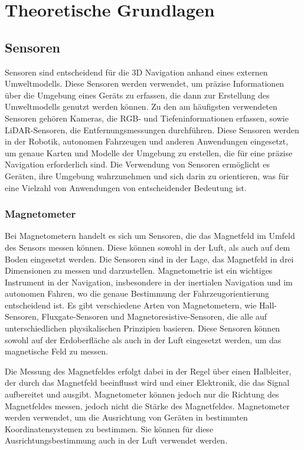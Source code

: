 \chapter{Theoretische Grundlagen}

\section{Sensoren} \label{sensoren:section}

Sensoren sind entscheidend für die 3D Navigation anhand eines externen Umweltmodells. Diese Sensoren werden verwendet, um präzise Informationen über die Umgebung eines Geräts zu erfassen, die dann zur Erstellung des Umweltmodells genutzt werden können. Zu den am häufigsten verwendeten Sensoren gehören Kameras, die RGB- und Tiefeninformationen erfassen, sowie LiDAR-Sensoren, die Entfernungsmessungen durchführen. Diese Sensoren werden in der Robotik, autonomen Fahrzeugen und anderen Anwendungen eingesetzt, um genaue Karten und Modelle der Umgebung zu erstellen, die für eine präzise Navigation erforderlich sind. Die Verwendung von Sensoren ermöglicht es Geräten, ihre Umgebung wahrzunehmen und sich darin zu orientieren, was für eine Vielzahl von Anwendungen von entscheidender Bedeutung ist.

    \subsection{Magnetometer} \label{magnetometer:subsection}

    Bei Magnetometern handelt es sich um Sensoren, die das Magnetfeld im Umfeld des Sensors messen können.
    Diese können sowohl in der Luft, als auch auf dem Boden eingesetzt werden.
    Die Sensoren sind in der Lage, das Magnetfeld in drei Dimensionen zu messen und darzustellen.
    Magnetometrie ist ein wichtiges Instrument in der Navigation, insbesondere in der inertialen Navigation und im autonomen Fahren, wo die genaue Bestimmung der Fahrzeugorientierung entscheidend ist. Es gibt verschiedene Arten von Magnetometern, wie Hall-Sensoren, Fluxgate-Sensoren und Magnetoresistive-Sensoren, die alle auf unterschiedlichen physikalischen Prinzipien basieren. Diese Sensoren können sowohl auf der Erdoberfläche als auch in der Luft eingesetzt werden, um das magnetische Feld zu messen.

    Die Messung des Magnetfeldes erfolgt dabei in der Regel über einen Halbleiter, der durch das Magnetfeld beeinflusst wird und einer Elektronik, die das Signal aufbereitet und ausgibt.
    Magnetometer können jedoch nur die Richtung des Magnetfeldes messen, jedoch nicht die Stärke des Magnetfeldes.
    Magnetometer werden verwendet, um die Ausrichtung von Geräten in bestimmten Koordinatensystemen zu bestimmen.
    Sie können für diese Ausrichtungsbestimmung auch in der Luft verwendet werden. 
